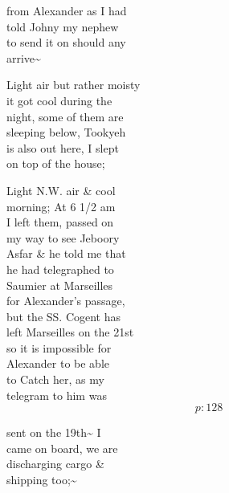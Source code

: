 \documentclass{report}
\begin{document}
	\par{
 	from Alexander as I had\ \\told Johny my nephew\ \\to send it on should any\ \\arrive\~{}\ \\
	}

	\par{
 	Light air but rather moisty\ \\it got cool during the\ \\night, some of them are\ \\sleeping below, Tookyeh\ \\is also out here, I slept\ \\on top of the house;\ \\
	}

	\par{
 	Light N.W. air \& cool\ \\morning; At 6 1/2 am\ \\I left them, passed on\ \\my way to see Jeboory\ \\Asfar \& he told me that\ \\he had telegraphed to\ \\Saumier at Marseilles\ \\for Alexander's passage,\ \\but the SS. Cogent has\ \\left Marseilles on the 21st\ \\so it is impossible for\ \\Alexander to be able\ \\to Catch her, as my\ \\telegram to him was\ \\
  \[p: 128 \]

	}


	\par{
 	sent on the 19th\~{} I\ \\came on board, we are\ \\discharging cargo \&\ \\shipping too;\~{}\ \\
	}
\end{document}
